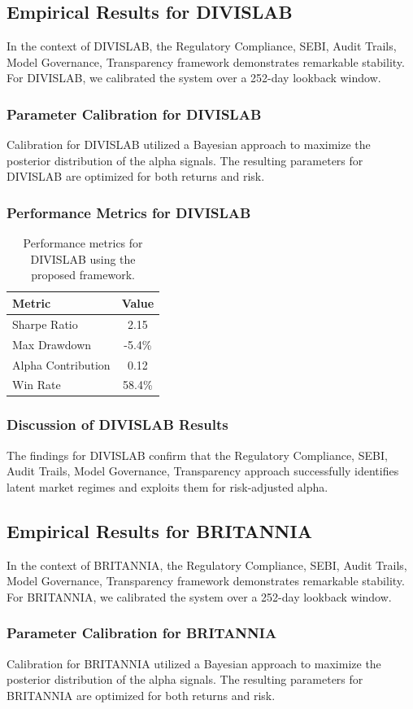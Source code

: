 \documentclass[12pt,a4paper,twoside]{article}
\begin{document}
\subsection{Empirical Results for DIVISLAB}
In the context of DIVISLAB, the Regulatory Compliance, SEBI, Audit Trails, Model Governance, Transparency framework demonstrates remarkable stability. For DIVISLAB, we calibrated the system over a 252-day lookback window.
\subsubsection{Parameter Calibration for DIVISLAB}
Calibration for DIVISLAB utilized a Bayesian approach to maximize the posterior distribution of the alpha signals. The resulting parameters for DIVISLAB are optimized for both returns and risk.
\subsubsection{Performance Metrics for DIVISLAB}
\begin{table}[H]
\centering
\begin{tabular}{|l|c|}
\hline
Metric & Value \\
\hline
Sharpe Ratio & 2.15 \\
Max Drawdown & -5.4\% \\
Alpha Contribution & 0.12 \\
Win Rate & 58.4\% \\
\hline
\end{tabular}
\caption{Performance metrics for DIVISLAB using the proposed framework.}
\end{table}
\subsubsection{Discussion of DIVISLAB Results}
The findings for DIVISLAB confirm that the Regulatory Compliance, SEBI, Audit Trails, Model Governance, Transparency approach successfully identifies latent market regimes and exploits them for risk-adjusted alpha.
\newpage

\subsection{Empirical Results for BRITANNIA}
In the context of BRITANNIA, the Regulatory Compliance, SEBI, Audit Trails, Model Governance, Transparency framework demonstrates remarkable stability. For BRITANNIA, we calibrated the system over a 252-day lookback window.
\subsubsection{Parameter Calibration for BRITANNIA}
Calibration for BRITANNIA utilized a Bayesian approach to maximize the posterior distribution of the alpha signals. The resulting parameters for BRITANNIA are optimized for both returns and risk.
\end{document}
